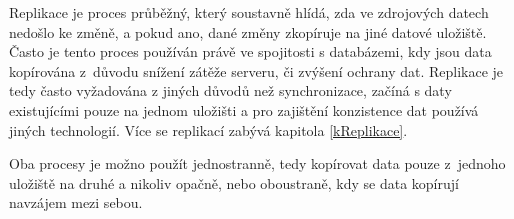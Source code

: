Replikace je proces průběžný, který soustavně hlídá, zda ve zdrojových datech nedošlo ke změně, a pokud ano, dané změny zkopíruje na jiné datové uložiště. Často je tento proces používán právě ve spojitosti s databázemi, kdy jsou data kopírována z~důvodu snížení zátěže serveru, či zvýšení ochrany dat. Replikace je tedy často vyžadována z jiných důvodů než synchronizace, začíná s daty existujícími pouze na jednom uložišti a pro zajištění konzistence dat používá jiných technologií. Více se replikací zabývá kapitola \ref{kReplikace}.

Oba procesy je možno použít jednostranně, tedy kopírovat data pouze z~jednoho uložiště na druhé a nikoliv opačně, nebo oboustraně, kdy se data kopírují navzájem mezi sebou.

